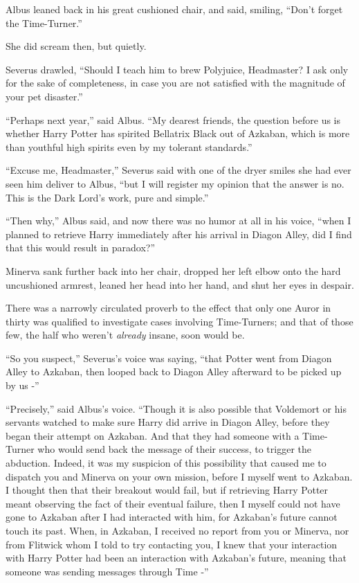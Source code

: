 Albus leaned back in his great cushioned chair, and said, smiling,
``Don't forget the Time-Turner.''

She did scream then, but quietly.

Severus drawled, ``Should I teach him to brew Polyjuice, Headmaster? I
ask only for the sake of completeness, in case you are not satisfied
with the magnitude of your pet disaster.''

``Perhaps next year,'' said Albus. ``My dearest friends, the question
before us is whether Harry Potter has spirited Bellatrix Black out of
Azkaban, which is more than youthful high spirits even by my tolerant
standards.''

``Excuse me, Headmaster,'' Severus said with one of the dryer smiles she
had ever seen him deliver to Albus, ``but I will register my opinion
that the answer is no. This is the Dark Lord's work, pure and simple.''

``Then why,'' Albus said, and now there was no humor at all in his
voice, ``when I planned to retrieve Harry immediately after his arrival
in Diagon Alley, did I find that this would result in paradox?''

Minerva sank further back into her chair, dropped her left elbow onto
the hard uncushioned armrest, leaned her head into her hand, and shut
her eyes in despair.

There was a narrowly circulated proverb to the effect that only one
Auror in thirty was qualified to investigate cases involving
Time-Turners; and that of those few, the half who weren't \emph{already}
insane, soon would be.

``So you suspect,'' Severus's voice was saying, ``that Potter went from
Diagon Alley to Azkaban, then looped back to Diagon Alley afterward to
be picked up by us -''

``Precisely,'' said Albus's voice. ``Though it is also possible that
Voldemort or his servants watched to make sure Harry did arrive in
Diagon Alley, before they began their attempt on Azkaban. And that they
had someone with a Time-Turner who would send back the message of their
success, to trigger the abduction. Indeed, it was my suspicion of this
possibility that caused me to dispatch you and Minerva on your own
mission, before I myself went to Azkaban. I thought then that their
breakout would fail, but if retrieving Harry Potter meant observing the
fact of their eventual failure, then I myself could not have gone to
Azkaban after I had interacted with him, for Azkaban's future cannot
touch its past. When, in Azkaban, I received no report from you or
Minerva, nor from Flitwick whom I told to try contacting you, I knew
that your interaction with Harry Potter had been an interaction with
Azkaban's future, meaning that someone was sending messages through Time
-''

